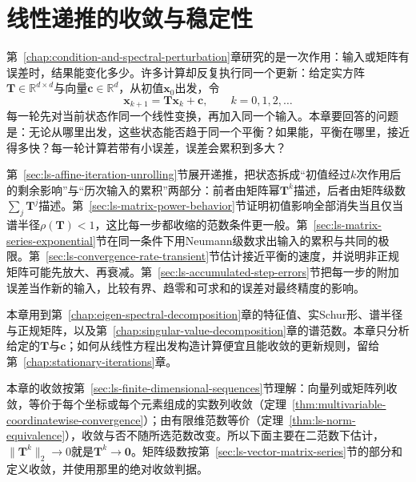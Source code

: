 
\chapter{线性递推的收敛与稳定性}
\label{sec:ls-convergence}
\label{sec:linear-algebra-convergence-approximation}
\label{chap:linear-recurrence-stability}

第~\ref{chap:condition-and-spectral-perturbation}章研究的是一次作用：输入或矩阵有误差时，结果能变化多少。许多计算却反复执行同一个更新：给定实方阵$\bm T\in\mathbb R^{d\times d}$与向量$\bm c\in\mathbb R^d$，从初值$\bm x_0$出发，令
\begin{equation}
 \bm x_{k+1}=\bm T\bm x_k+\bm c,\qquad k=0,1,2,\ldots
 \label{eq:ls-affine-iteration}
\end{equation}
每一轮先对当前状态作同一个线性变换，再加入同一个输入。本章要回答的问题是：无论从哪里出发，这些状态能否趋于同一个平衡？如果能，平衡在哪里，接近得多快？每一轮计算若带有小误差，误差会累积到多大？

第~\ref{sec:ls-affine-iteration-unrolling}节展开递推，把状态拆成“初值经过$k$次作用后的剩余影响”与“历次输入的累积”两部分：前者由矩阵幂$\bm T^k$描述，后者由矩阵级数$\sum_j\bm T^j$描述。第~\ref{sec:ls-matrix-power-behavior}节证明初值影响全部消失当且仅当谱半径$\rho(\bm T)<1$，这比每一步都收缩的范数条件更一般。第~\ref{sec:ls-matrix-series-exponential}节在同一条件下用Neumann级数求出输入的累积与共同的极限。第~\ref{sec:ls-convergence-rate-transient}节估计接近平衡的速度，并说明非正规矩阵可能先放大、再衰减。第~\ref{sec:ls-accumulated-step-errors}节把每一步的附加误差当作新的输入，比较有界、趋零和可求和的误差对最终精度的影响。

本章用到第~\ref{chap:eigen-spectral-decomposition}章的特征值、实Schur形、谱半径与正规矩阵，以及第~\ref{chap:singular-value-decomposition}章的谱范数。本章只分析给定的$\bm T$与$\bm c$；如何从线性方程出发构造计算便宜且能收敛的更新规则，留给第~\ref{chap:stationary-iterations}章。

本章的收敛按第~\ref{sec:ls-finite-dimensional-sequences}节理解：向量列或矩阵列收敛，等价于每个坐标或每个元素组成的实数列收敛（定理~\ref{thm:multivariable-coordinatewise-convergence}）；由有限维范数等价（定理~\ref{thm:ls-norm-equivalence}），收敛与否不随所选范数改变。所以下面主要在二范数下估计，$\lVert\bm T^k\rVert_2\to0$就是$\bm T^k\to\bm0$。矩阵级数按第~\ref{sec:ls-vector-matrix-series}节的部分和定义收敛，并使用那里的绝对收敛判据。

